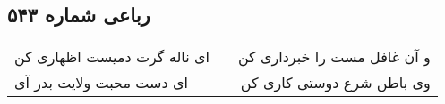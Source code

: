 \begin{center}
\section*{رباعی شماره ۵۴۳}
\label{sec:sh543}
\begin{longtable}{l p{0.5cm} r}
ای ناله گرت دمیست اظهاری کن
&&
و آن غافل مست را خبرداری کن
\\
ای دست محبت ولایت بدر آی
&&
وی باطن شرع دوستی کاری کن
\\
\end{longtable}
\end{center}
